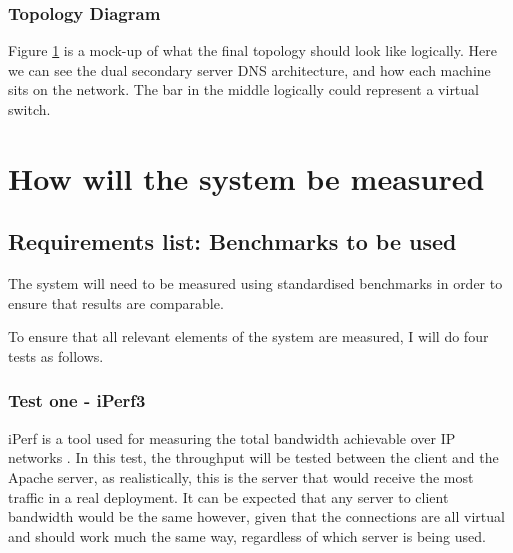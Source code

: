 \subsection{Topology Diagram}
\label{subsec:TopologyDiagram}
Figure \ref{fig:Topology} is a mock-up of what the final topology should look like logically. Here we can see the dual secondary server DNS architecture, and how each machine sits on the network. The bar in the middle logically could represent a virtual switch.
\begin{figure}[H]
\caption{}
\label{fig:Topology}
\centering
\end{figure}

\chapter{How will the system be measured}

\section{Requirements list: Benchmarks to be used}
\label{RequirementsListBench}
The system will need to be measured using standardised benchmarks in order to ensure that results are comparable.

To ensure that all relevant elements of the system are measured, I will do four tests as follows.

\subsection{Test one - iPerf3}
iPerf is a tool used for measuring the total bandwidth achievable over IP networks \citep{iPerf3}. In this test, the throughput will be tested between the client and the Apache server, as realistically, this is the server that would receive the most traffic in a real deployment. It can be expected that any server to client bandwidth would be the same however, given that the connections are all virtual and should work much the same way, regardless of which server is being used.

